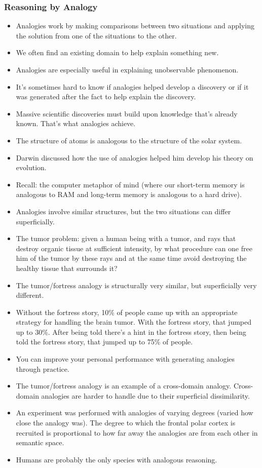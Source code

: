 \documentclass[]{article}
\newcommand{\lecture}[1]{\marginpar{{\footnotesize $\leftarrow$ \underline{#1}}}}
\begin{document}
			\subsubsection{Reasoning by Analogy}
				\begin{itemize}
					\item Analogies work by making comparisons between two situations and applying the solution from one of the situations to the other.
					\item We often find an existing domain to help explain something new.
					\item Analogies are especially useful in explaining unobservable phenomenon.
					\item It's sometimes hard to know if analogies helped develop a discovery or if it was generated after the fact to help explain the discovery.
					\item Massive scientific discoveries must build upon knowledge that's already known. That's what analogies achieve.
					\item The structure of atoms is analogous to the structure of the solar system.
					\item Darwin discussed how the use of analogies helped him develop his theory on evolution.
					\item Recall: the computer metaphor of mind (where our short-term memory is analogous to RAM and long-term memory is analogous to a hard drive).
					\item Analogies involve similar structures, but the two situations can differ superficially.
					\item The tumor problem: given a human being with a tumor, and rays that destroy organic tissue at sufficient intensity, by what procedure can one free him of the tumor by these rays and at the same time avoid destroying the healthy tissue that surrounds it?
					\item The tumor/fortress analogy is structurally very similar, but superficially very different.
					\item Without the fortress story, 10\% of people came up with an appropriate strategy for handling the brain tumor. With the fortress story, that jumped up to 30\%. After being told there's a hint in the fortress story, then being told the fortress story, that jumped up to 75\% of people.
					\item You can improve your personal performance with generating analogies through practice.
					\item The tumor/fortress analogy is an example of a cross-domain analogy. Cross-domain analogies are harder to handle due to their superficial dissimilarity. \lecture{March 21, 2013}
					\item An experiment was performed with analogies of varying degrees (varied how close the analogy was). The degree to which the frontal polar cortex is recruited is proportional to how far away the analogies are from each other in semantic space.
					\item Humans are probably the only species with analogous reasoning.
				\end{itemize}
\end{document}
